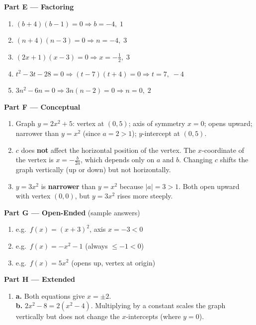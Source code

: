 \documentclass[12pt]{article}
\begin{document}
\begin{tcolorbox}[ansbox]
\medskip
\textbf{Part E — Factoring}

\begin{enumerate}[leftmargin=*, label=\textbf{\arabic*.}, start=17]
  \item $(b+4)(b-1)=0 \Rightarrow b = -4,\; 1$
  \item $(n+4)(n-3)=0 \Rightarrow n = -4,\; 3$
  \item $(2x+1)(x-3)=0 \Rightarrow x = -\frac{1}{2},\; 3$
  \item $t^2-3t-28=0 \Rightarrow (t-7)(t+4)=0 \Rightarrow t = 7,\; -4$
  \item $3n^2-6n=0 \Rightarrow 3n(n-2)=0 \Rightarrow n = 0,\; 2$
\end{enumerate}

\medskip
\textbf{Part F — Conceptual}

\begin{enumerate}[leftmargin=*, label=\textbf{\arabic*.}, start=22]
  \item Graph $y = 2x^2 + 5$: vertex at $(0,5)$; axis of symmetry $x=0$; opens upward; narrower than $y=x^2$ (since $a=2>1$); $y$-intercept at $(0,5)$.
  \item $c$ does \textbf{not} affect the horizontal position of the vertex. The $x$-coordinate of the vertex is $x = -\frac{b}{2a}$, which depends only on $a$ and $b$. Changing $c$ shifts the graph vertically (up or down) but not horizontally.
  \item $y = 3x^2$ is \textbf{narrower} than $y = x^2$ because $|a| = 3 > 1$. Both open upward with vertex $(0,0)$, but $y=3x^2$ rises more steeply.
\end{enumerate}

\medskip
\textbf{Part G — Open-Ended} (sample answers)

\begin{enumerate}[leftmargin=*, label=\textbf{\arabic*.}, start=25]
  \item e.g.\ $f(x) = (x+3)^2$, axis $x = -3 < 0$
  \item e.g.\ $f(x) = -x^2 - 1$ (always $\le -1 < 0$)
  \item e.g.\ $f(x) = 5x^2$ (opens up, vertex at origin)
\end{enumerate}

\medskip
\textbf{Part H — Extended}

\begin{enumerate}[leftmargin=*, label=\textbf{\arabic*.}, start=28]
  \item \textbf{a.} Both equations give $x = \pm 2$.\\
        \textbf{b.} $2x^2 - 8 = 2(x^2-4)$. Multiplying by a constant scales the graph vertically but does not change the $x$-intercepts (where $y=0$).


\end{enumerate}
\end{tcolorbox}
\end{document}
